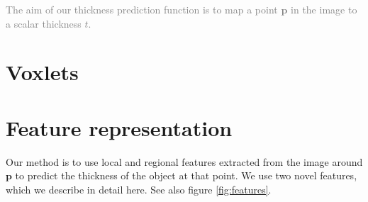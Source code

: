 \documentclass[10pt,twocolumn,letterpaper]{article}
\newcommand{\point}{\mathbf{p}}
\newcommand{\remove}[1]{\textcolor{grey}{#1}}
\begin{document}
\remove{The aim of our thickness prediction function is to map a point $\point$ in the image to a scalar thickness $t$.}





\section{Voxlets}


\section{Feature representation}


Our method is to use local and regional features extracted from the image around $\point$ to predict the thickness of the object at that point.
We use two novel features, which we describe in detail here. See also figure \ref{fig:features}.
\end{document}
